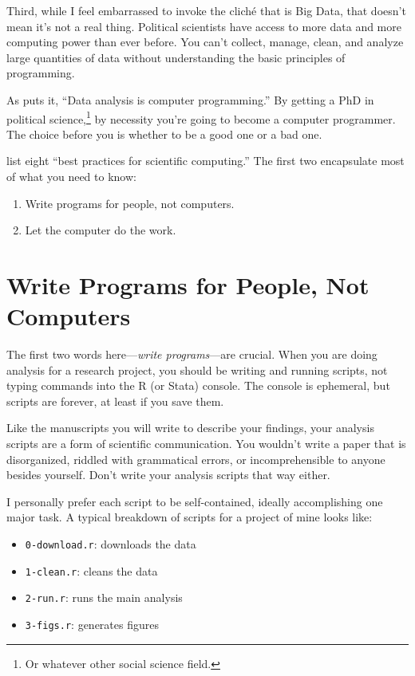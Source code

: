 \documentclass[12pt,oneside,openany]{book}
\providecommand{\tightlist}{%
  \setlength{\itemsep}{0pt}\setlength{\parskip}{0pt}}
\begin{document}
Third, while I feel embarrassed to invoke the cliché that is Big Data,
that doesn't mean it's not a real thing. Political scientists have
access to more data and more computing power than ever before. You can't
collect, manage, clean, and analyze large quantities of data without
understanding the basic principles of programming.

As \citet{Bowers:2011ua} puts it, ``Data analysis is computer
programming.'' By getting a PhD in political science,\footnote{Or
  whatever other social science field.} by necessity you're going to
become a computer programmer. The choice before you is whether to be a
good one or a bad one.

\citet{Wilson:2014ck} list eight ``best practices for scientific
computing.'' The first two encapsulate most of what you need to know:

\begin{enumerate}
\def\labelenumi{\arabic{enumi}.}
\tightlist
\item
  Write programs for people, not computers.
\item
  Let the computer do the work.
\end{enumerate}

\section{Write Programs for People, Not
Computers}\label{write-programs-for-people-not-computers}

The first two words here---\emph{write programs}---are crucial. When you
are doing analysis for a research project, you should be writing and
running scripts, not typing commands into the R (or Stata) console. The
console is ephemeral, but scripts are forever, at least if you save
them.

Like the manuscripts you will write to describe your findings, your
analysis scripts are a form of scientific communication. You wouldn't
write a paper that is disorganized, riddled with grammatical errors, or
incomprehensible to anyone besides yourself. Don't write your analysis
scripts that way either.

I personally prefer each script to be self-contained, ideally
accomplishing one major task. A typical breakdown of scripts for a
project of mine looks like:

\begin{itemize}
\tightlist
\item
  \texttt{0-download.r}: downloads the data
\item
  \texttt{1-clean.r}: cleans the data
\item
  \texttt{2-run.r}: runs the main analysis
\item
  \texttt{3-figs.r}: generates figures
\end{itemize}
\end{document}
